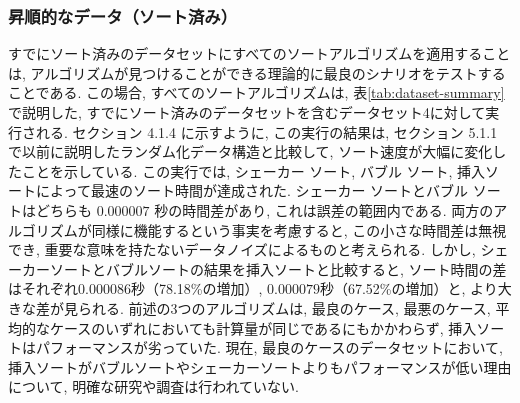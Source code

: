 \documentclass[a4j, 11pt]{jarticle}
\begin{document}
\subsubsection{昇順的なデータ（ソート済み）}
すでにソート済みのデータセットにすべてのソートアルゴリズムを適用することは, アルゴリズムが見つけることができる理論的に最良のシナリオをテストすることである. この場合, すべてのソートアルゴリズムは, 表\ref{tab:dataset-summary}で説明した, すでにソート済みのデータセットを含むデータセット4に対して実行される. セクション 4.1.4 に示すように, この実行の結果は, セクション 5.1.1 で以前に説明したランダム化データ構造と比較して, ソート速度が大幅に変化したことを示している. この実行では, シェーカー ソート, バブル ソート, 挿入ソートによって最速のソート時間が達成された. シェーカー ソートとバブル ソートはどちらも $0.000007$ 秒の時間差があり, これは誤差の範囲内である. 両方のアルゴリズムが同様に機能するという事実を考慮すると, この小さな時間差は無視でき, 重要な意味を持たないデータノイズによるものと考えられる. しかし, シェーカーソートとバブルソートの結果を挿入ソートと比較すると, ソート時間の差はそれぞれ$0.000086$秒（78.18\%の増加）, $0.000079$秒（67.52\%の増加）と, より大きな差が見られる. 前述の3つのアルゴリズムは, 最良のケース, 最悪のケース, 平均的なケースのいずれにおいても計算量が同じであるにもかかわらず, 挿入ソートはパフォーマンスが劣っていた. 現在, 最良のケースのデータセットにおいて, 挿入ソートがバブルソートやシェーカーソートよりもパフォーマンスが低い理由について, 明確な研究や調査は行われていない. \
\end{document}
